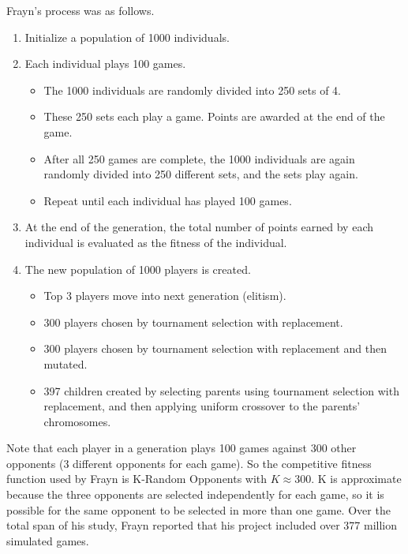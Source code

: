 Frayn's process was as follows. 

\begin{enumerate}
  \item Initialize a population of 1000 individuals.
  \item Each individual plays 100 games.
  
  \begin {itemize}
    \item The 1000  individuals are randomly divided into 250 sets of 4.
    \item These 250 sets each play a game. Points are awarded at the end of the
    game.
    \item After all 250 games are complete, the 1000 individuals are again
    randomly divided into 250 different sets, and the sets play again.
    \item Repeat until each individual has played 100 games.
  \end{itemize}
  
  \item At the end of the generation, the total number of points earned by each
  individual is evaluated as the fitness of the individual.
  \item The new population of 1000 players is created.
  \begin{itemize}
    \item Top 3 players move into next generation (elitism).
    \item 300 players chosen by tournament selection with replacement.
    \item 300 players chosen by tournament selection with replacement and then
    mutated.
    \item 397 children created by selecting parents using tournament selection
    with replacement, and then applying uniform crossover to the parents'
    chromosomes.
  \end {itemize}
\end{enumerate}

Note that each player in a generation plays 100 games against 300 other
opponents (3 different opponents for each game). So the competitive fitness
function used by Frayn is K-Random Opponents with \(K\approx300\). K is
approximate because the three opponents are selected independently for each
game, so it is possible for the same opponent to be selected in more than one
game. Over the total span of his study, Frayn reported that his project
included over 377 million simulated games.

